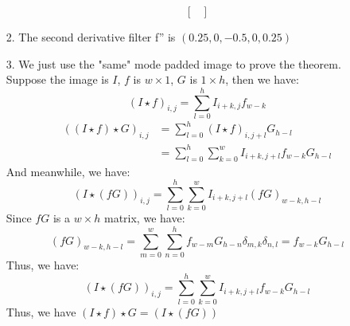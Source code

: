 \documentclass[]{article}
\begin{document}
\begin{enumerate}
\begin{equation*}
\begin{bmatrix}
			\end{bmatrix}
		\end{equation*}
		\item [2.]
		The second derivative filter
		f'' is \((0.25, 0, -0.5 , 0, 0.25)\)
		\item [3.]
		We just use the "same" mode padded image to prove the theorem.\\
		Suppose the image is \(I\), \(f\) is \(w\times 1\), \(G\) is \(1 \times h\), then we have:
		\[(I\star f)_{i, j}=\sum_{l=0}^{h}I_{i+k,j}f_{w-k}\]
		\begin{align*}
		((I\star f)\star G)_{i,j}&=\sum_{l=0}^{h}(I\star f)_{i, j+l}G_{h-l}\\
		&=\sum_{l=0}^{h}\sum_{k=0}^{w}I_{i+k,j+l}f_{w-k}G_{h-l}
		\end{align*}
		And meanwhile, we have:
		\[(I\star (fG))_{i,j}=\sum_{l=0}^{h}\sum_{k=0}^{w}I_{i+k,j+l}(fG)_{w-k, h-l}\]
		Since \(fG\) is a \(w\times h\) matrix, we have:
		\[(fG)_{w-k, h-l}=\sum_{m=0}^{w}\sum_{n=0}^{h}f_{w-m}G_{h-n}\delta_{m, k}\delta_{n, l}=f_{w-k}G_{h-l}\]
		Thus, we have:
		\[(I\star (fG))_{i,j}=\sum_{l=0}^{h}\sum_{k=0}^{w}I_{i+k,j+l}f_{w-k}G_{h-l}\]
		Thus, we have \((I\star f)\star G=(I\star (fG))\)
\end{enumerate}
\end{document}
